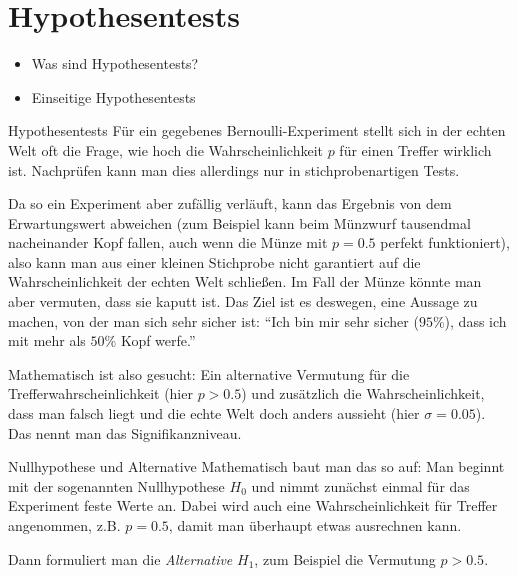 \chapter{Hypothesentests}
\begin{inhalt}
  \begin{itemize}
    \item Was sind Hypothesentests?
    \item Einseitige Hypothesentests
  \end{itemize}
\end{inhalt}

\begin{bla}
  {Hypothesentests}
  Für ein gegebenes Bernoulli-Experiment stellt sich in der echten Welt oft die Frage, wie hoch die Wahrscheinlichkeit $p$ für einen Treffer wirklich ist.
  Nachprüfen kann man dies allerdings nur in stichprobenartigen Tests.

  Da so ein Experiment aber zufällig verläuft, kann das Ergebnis von dem Erwartungswert abweichen (zum Beispiel kann beim Münzwurf tausendmal nacheinander Kopf fallen, auch wenn die Münze mit $p=0.5$ perfekt funktioniert), also kann man aus einer kleinen Stichprobe nicht garantiert auf die Wahrscheinlichkeit der echten Welt schließen.
  Im Fall der Münze könnte man aber vermuten, dass sie kaputt ist.
  Das Ziel ist es deswegen, eine Aussage zu machen, von der man sich sehr sicher ist: ``Ich bin mir sehr sicher ($95\%$), dass ich mit mehr als \( 50\% \) Kopf werfe.''

  Mathematisch ist also gesucht:
  Ein alternative Vermutung für die Trefferwahrscheinlichkeit (hier $p>0.5$) und zusätzlich die Wahrscheinlichkeit, dass man falsch liegt und die echte Welt doch anders aussieht (hier $\sigma = 0.05$). Das nennt man das Signifikanzniveau.
\end{bla}

\begin{bla}{Nullhypothese und Alternative}
  Mathematisch baut man das so auf:
  Man beginnt mit der sogenannten Nullhypothese $H_0$ und nimmt zunächst einmal für das Experiment feste Werte an.
  Dabei wird auch eine Wahrscheinlichkeit für Treffer angenommen, z.B. $p=0.5$, damit man überhaupt etwas ausrechnen kann.

  Dann formuliert man die \emph{Alternative} $H_1$, zum Beispiel die Vermutung $p>0.5$.
\end{bla}

